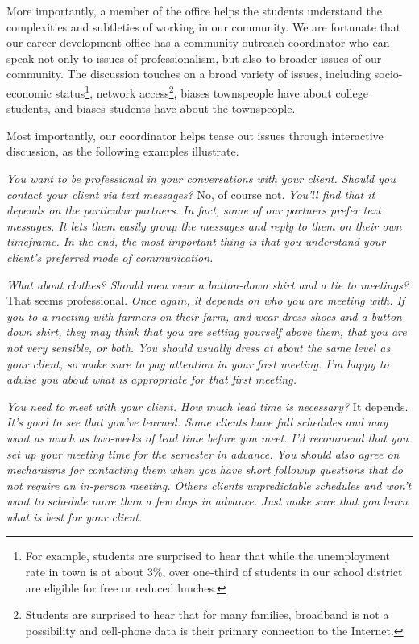 More importantly, a member of the office helps the students understand
the complexities and subtleties of working in our community.  We
are fortunate that our career development office has a community
outreach coordinator who can speak not only to issues of professionalism,
but also to broader issues of our community.  The discussion touches
on a broad variety of issues, including socio-economic status\footnote{For
example, students are surprised to hear that while the unemployment
rate in town is at about 3\%, over one-third of students in our
school district are eligible for free or reduced lunches.}, network
access\footnote{Students are surprised to hear that for many families,
broadband is not a possibility and cell-phone data is their primary
connection to the Internet.}, biases townspeople have about college
students, and biases students have about the townspeople.

Most importantly, our coordinator helps tease out issues through interactive
discussion, as the following examples illustrate.

\newcommand{\question}[1]{\textsl{#1}}
\newcommand{\answer}[1]{#1}
\newcommand{\followup}[1]{\textsl{#1}}

\question{You want to be professional in your conversations with your client.  Should you contact your client via text messages?}
\answer{No, of course not.}
\followup{You'll find that it depends on the particular partners.  In fact, some of our partners prefer text messages.  It lets them easily group the messages and reply to them on their own timeframe.  In the end, the most important thing is that you understand your client's preferred mode of communication.}

\question{What about clothes?  Should men wear a button-down shirt and a tie to meetings?}
\answer{That seems professional.}
\followup{Once again, it depends on who you are meeting with.  If
you to a meeting with farmers on their farm, and wear dress shoes
and a button-down shirt, they may think that you are setting
yourself above them, that you are not very sensible, or both.
You should usually dress at about the same level as your client,
so make sure to pay attention in your first meeting.  I'm happy
to advise you about what is appropriate for that first meeting.}

\question{You need to meet with your client.  How much lead time is necessary?}
\answer{It depends.}
\followup{It's good to see that you've learned.  Some clients have full
schedules and may want as much as two-weeks of lead time before
you meet.  I'd recommend that you set up your meeting time for the
semester in advance.  You should also agree on mechanisms for
contacting them when you have short followup questions that do not
require an in-person meeting.  Others clients unpredictable schedules
and won't want to schedule more than a few days in advance.  Just make
sure that you learn what is best for your client.}

